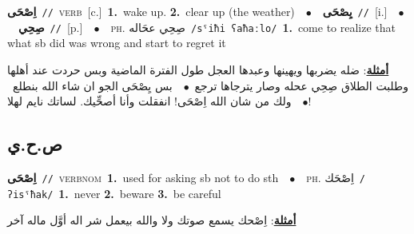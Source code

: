 \documentclass[10pt,a4paper,twoside]{article} %
\begin{document}
\begin{multicols}{2}
{{{{{{{{{{{{\setlength\topsep{0pt}\textbf{\foreignlanguage{arabic}{اِصْحَى}}\ {\color{gray}\texttt{//}\color{black}}\ \textsc{verb}\ [c.]\ \textbf{1.}~wake up.  \textbf{2.}~clear up (the weather)\ \ $\bullet$\ \ \setlength\topsep{0pt}\textbf{\foreignlanguage{arabic}{يِصْحَى}}\ {\color{gray}\texttt{//}\color{black}}\ [i.]\ \ $\bullet$\ \ \setlength\topsep{0pt}\textbf{\foreignlanguage{arabic}{صِحِي}}\ {\color{gray}\texttt{//}\color{black}}\ [p.]\ \ $\bullet$\ \ \textsc{ph.} \color{gray} \foreignlanguage{arabic}{صِحِي عحَاله}\color{black}\ {\color{gray}\texttt{/{\sffamily sˤiħi ʕaħaːlo}/}\color{black}}\ \textbf{1.}~come to realize that what sb did was wrong and start to regret it\  \begin{flushright}\color{gray}\foreignlanguage{arabic}{\textbf{\underline{\foreignlanguage{arabic}{أمثلة}}}: ضله يضربها ويهينها وعبدها العجل طول الفترة الماضية وبس حردت عند أهلها وطلبت الطلاق صِحِي عحله وصار يترجاها ترجع\ $\bullet$\ \  بس يِصْحَى الجو ان شاء الله بنطلع\ $\bullet$\ \  ولك من شان الله اِصْحَى! انفقلت وأنا أصحِّيك. لساتك نايم لهلا!}\end{flushright}\color{black}} \vspace{2mm}

\vspace{-3mm}
\subsection*{\color{blue}\foreignlanguage{arabic}{ص.ح.ي}\color{blue}{}} 

{\setlength\topsep{0pt}\textbf{\foreignlanguage{arabic}{اِصْحَى}}\ {\color{gray}\texttt{//}\color{black}}\ \textsc{verb\textunderscore nom}\ \textbf{1.}~used for asking sb not to do sth\ \ $\bullet$\ \ \textsc{ph.} \color{gray} \foreignlanguage{arabic}{اِصْحَك}\color{black}\ {\color{gray}\texttt{/{\sffamily ʔisˤħak}/}\color{black}}\ \textbf{1.}~never  \textbf{2.}~beware  \textbf{3.}~be careful\  \begin{flushright}\color{gray}\foreignlanguage{arabic}{\textbf{\underline{\foreignlanguage{arabic}{أمثلة}}}: اِصْحك يسمع صوتك ولا والله بيعمل شر اله أوَّل ماله آخر}\end{flushright}\color{black}} \vspace{2mm}

}}}}}}}}}}}
\end{multicols}
\end{document}
